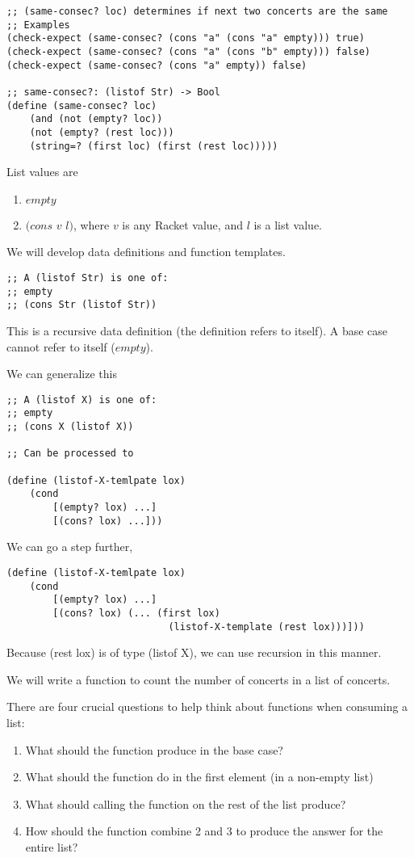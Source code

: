 \documentclass{article}
\begin{document}
\begin{lstlisting}
;; (same-consec? loc) determines if next two concerts are the same
;; Examples
(check-expect (same-consec? (cons "a" (cons "a" empty))) true)
(check-expect (same-consec? (cons "a" (cons "b" empty))) false)
(check-expect (same-consec? (cons "a" empty)) false)

;; same-consec?: (listof Str) -> Bool
(define (same-consec? loc)
    (and (not (empty? loc))
    (not (empty? (rest loc)))
    (string=? (first loc) (first (rest loc)))))
\end{lstlisting}

List values are 
\begin{enumerate}
    \item $empty$
    \item $(cons$ $v$ $l)$, where $v$ is any Racket value, and $l$ is a list value.
\end{enumerate}

We will develop data definitions and function templates. 
\begin{lstlisting}
;; A (listof Str) is one of:
;; empty
;; (cons Str (listof Str))
\end{lstlisting}

This is a recursive data definition (the definition refers to itself). A base case cannot refer to itself ($empty$). 

We can generalize this
\begin{lstlisting}
;; A (listof X) is one of:
;; empty
;; (cons X (listof X))

;; Can be processed to

(define (listof-X-temlpate lox)
    (cond
        [(empty? lox) ...]
        [(cons? lox) ...]))
\end{lstlisting}

We can go a step further,
\begin{lstlisting}
(define (listof-X-temlpate lox)
    (cond
        [(empty? lox) ...]
        [(cons? lox) (... (first lox)
                            (listof-X-template (rest lox)))]))
\end{lstlisting}

Because (rest lox) is of type (listof X), we can use recursion in this manner. 

We will write a function to count the number of concerts in a list of concerts. 

There are four crucial questions to help think about functions when consuming a list:
\begin{enumerate}
    \item What should the function produce in the base case?
    \item What should the function do in the first element (in a non-empty list)
    \item What should calling the function on the rest of the list produce?
    \item How should the function combine 2 and 3 to produce the answer for the entire list?
\end{enumerate}
\end{document}
